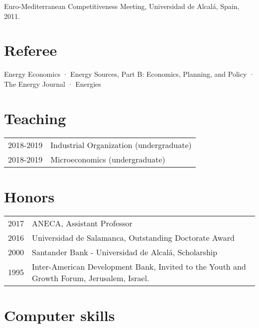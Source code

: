 \documentclass[11pt]{article}\usepackage[]{graphicx}\usepackage[]{color}
\begin{document}
 Euro-Mediterranean Competitiveness Meeting, Universidad de Alcalá, Spain, 2011.


\section{Referee} 

\raggedright
Energy Economics · Energy Sources, Part B: Economics, Planning, and Policy · The Energy Journal · Energies


\section{Teaching} 

\begin{tabular}{R{2cm} | L{12cm}}

2018-2019 & Industrial Organization (undergraduate)\\

2018-2019 & Microeconomics (undergraduate)\\

\end{tabular}


\section{Honors} 

\begin{tabular}{R{2cm} | L{12cm}}

2017 & ANECA, Assistant Professor\\

2016 & Universidad de Salamanca, Outstanding Doctorate Award\\

2000	& Santander Bank - Universidad de Alcalá, Scholarship\\

1995 & Inter-American Development Bank, Invited to the Youth and Growth Forum, Jerusalem, Israel.\\

\end{tabular}


\section{Computer skills} 
\end{document}
